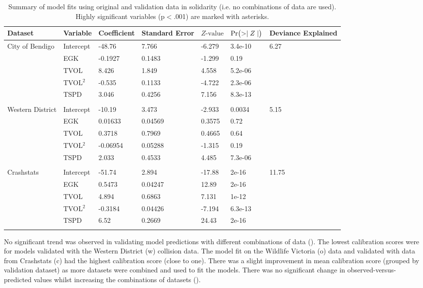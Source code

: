 \begin{table}[htp]
\caption[Summary of model fits using original and validation data]{Summary of model fits using original and validation data in solidarity (i.e. no combinations of data are used). Highly significant variables (p$<$.001) are marked with asterisks.}
\begin{tabularx}{\textwidth}{lllllll} \toprule
Dataset & Variable & Coefficient & Standard Error & $Z\text{-value}$ & $\text{Pr}\bigl( >\mid Z \mid \bigr)$ & Deviance Explained \\ 
  \midrule
City of Bendigo & Intercept & -48.76 & 7.766 & -6.279 & 3.4e-10 & 6.27 \\ 
   & EGK & -0.1927 & 0.1483 & -1.299 & 0.19 &  \\ 
   & TVOL & 8.426 & 1.849 & 4.558 & 5.2e-06 &  \\ 
   & TVOL$^2$ & -0.535 & 0.1133 & -4.722 & 2.3e-06 &  \\ 
   & TSPD & 3.046 & 0.4256 & 7.156 & 8.3e-13 &  \\ 
   &  &  &  &  &  &  \\ 
  Western District & Intercept & -10.19 & 3.473 & -2.933 & 0.0034 & 5.15 \\ 
   & EGK & 0.01633 & 0.04569 & 0.3575 & 0.72 &  \\ 
   & TVOL & 0.3718 & 0.7969 & 0.4665 & 0.64 &  \\ 
   & TVOL$^2$ & -0.06954 & 0.05288 & -1.315 & 0.19 &  \\ 
   & TSPD & 2.033 & 0.4533 & 4.485 & 7.3e-06 &  \\ 
   &  &  &  &  &  &  \\ 
  Crashstats & Intercept & -51.74 & 2.894 & -17.88 & 2e-16 & 11.75 \\ 
   & EGK & 0.5473 & 0.04247 & 12.89 & 2e-16 &  \\ 
   & TVOL & 4.894 & 0.6863 & 7.131 & 1e-12 &  \\ 
   & TVOL$^2$ & -0.3184 & 0.04426 & -7.194 & 6.3e-13 &  \\ 
   & TSPD & 6.52 & 0.2669 & 24.43 & 2e-16 &  \\ 
   &  &  &  &  &  &  \\ 
\bottomrule
\end{tabularx}
\label{val_glm_perf}
\end{table}

No significant trend was observed in validating model predictions with different combinations of data (). The lowest calibration scores were for models validated with the Western District (w) collision data. The model fit on the Wildlife Victoria (o) data and validated with data from Crashstats (c) had the highest calibration score (close to one). There was a slight improvement in mean calibration score (grouped by validation dataset) as more datasets were combined and used to fit the models. There was no significant change in observed-versus-predicted values whilst increasing the combinations of datasets ().

